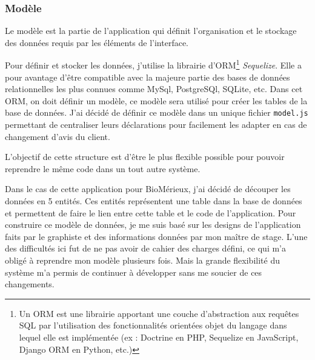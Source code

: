 \subsubsection{Modèle}

Le modèle est la partie de l'application qui définit l'organisation et le stockage des données requis par les éléments de l'interface.

Pour définir et stocker les données, j'utilise la librairie d'ORM\footnote{Un ORM est une librairie apportant une couche d'abstraction aux requêtes SQL par l'utilisation des fonctionnalités orientées objet du langage dans lequel elle est implémentée (ex : Doctrine en PHP, Sequelize en JavaScript, Django ORM en Python, etc.)} \emph{Sequelize}.
Elle a pour avantage d'être compatible avec la majeure partie des bases de données relationnelles les plus connues comme MySql, PostgreSQl, SQLite, etc.
Dans cet ORM, on doit définir un modèle, ce modèle sera utilisé pour créer les tables de la base de données.
J'ai décidé de définir ce modèle dans un unique fichier \texttt{model.js} permettant de centraliser leurs déclarations pour facilement les adapter en cas de changement d'avis du client.

L'objectif de cette structure est d'être le plus flexible possible pour pouvoir reprendre le même code dans un tout autre système.

\bigskip

Dans le cas de cette application pour BioMérieux, j'ai décidé de découper les données en 5 entités.
Ces entités représentent une table dans la base de données et permettent de faire le lien entre cette table et le code de l'application.
Pour construire ce modèle de données, je me suis basé sur les designs de l'application faits par le graphiste et des informations données par mon maître de stage.
L'une des difficultés ici fut de ne pas avoir de cahier des charges défini, ce qui m’a obligé à reprendre mon modèle plusieurs fois.
Mais la grande flexibilité du système m'a permis de continuer à développer sans me soucier de ces changements.

\bigskip

